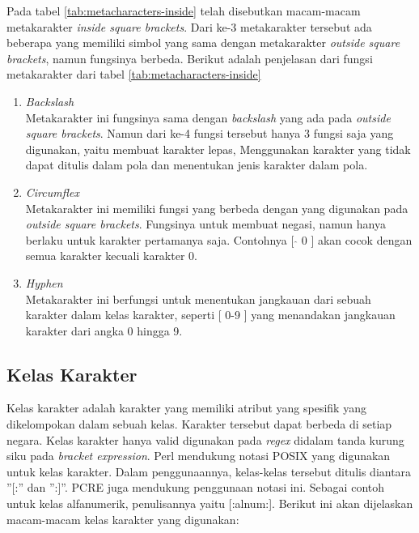 Pada tabel \ref{tab:metacharacters-inside} telah disebutkan macam-macam metakarakter \textit{inside square brackets}. Dari ke-3 metakarakter tersebut ada beberapa yang memiliki simbol yang sama dengan metakarakter \textit{outside square brackets}, namun fungsinya berbeda. Berikut adalah penjelasan dari fungsi metakarakter dari tabel \ref{tab:metacharacters-inside}

\begin{enumerate}
	\item \textit{Backslash} \\
	Metakarakter ini fungsinya sama dengan \textit{backslash} yang ada pada \textit{outside square brackets}. Namun dari ke-4 fungsi tersebut hanya 3 fungsi saja yang digunakan, yaitu membuat karakter lepas, Menggunakan karakter yang tidak dapat ditulis dalam pola dan menentukan jenis karakter dalam pola.
	
	\item \textit{Circumflex} \\
	Metakarakter ini memiliki fungsi yang berbeda dengan yang digunakan pada \textit{outside square brackets}. Fungsinya untuk membuat negasi, namun hanya berlaku untuk karakter pertamanya saja. Contohnya [ $\hat{}$ 0 ] akan cocok dengan semua karakter kecuali karakter 0.
	
	\item \textit{Hyphen} \\
	Metakarakter ini berfungsi untuk menentukan jangkauan dari sebuah karakter dalam kelas karakter, seperti [ 0-9 ] yang menandakan jangkauan karakter dari angka 0 hingga 9.
	
\end{enumerate}
	
\subsection{Kelas Karakter}

Kelas karakter adalah karakter yang memiliki atribut yang spesifik yang dikelompokan dalam sebuah kelas. Karakter tersebut dapat berbeda di setiap negara. Kelas karakter hanya valid digunakan pada \textit{regex} didalam tanda kurung siku pada \textit{bracket expression}. Perl mendukung notasi POSIX yang digunakan untuk kelas karakter. Dalam penggunaannya, kelas-kelas tersebut ditulis diantara ''[:'' dan '':]''. PCRE juga mendukung penggunaan notasi ini. Sebagai contoh untuk kelas alfanumerik, penulisannya yaitu [:alnum:]. Berikut ini akan dijelaskan macam-macam kelas karakter yang digunakan:

